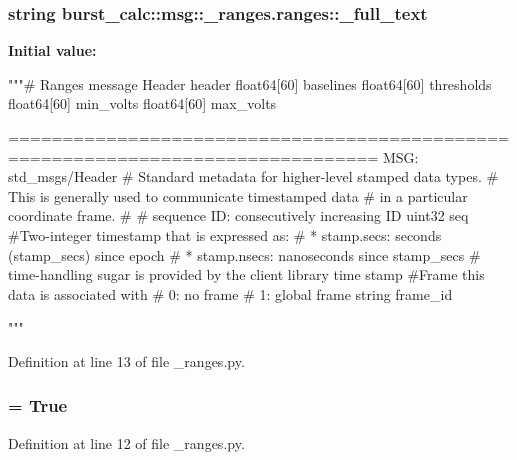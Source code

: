 \subsubsection[{\-\_\-full\-\_\-text}]{\setlength{\rightskip}{0pt plus 5cm}string {\bf burst\-\_\-calc\-::msg\-::\-\_\-ranges.\-ranges\-::\-\_\-full\-\_\-text}\hspace{0.3cm}{\ttfamily  [static, private]}}\label{classburst__calc_1_1msg_1_1__ranges_1_1ranges_aefd3611b9972291d06d7b72609d48af2}
{\bfseries \-Initial value\-:}
\begin{DoxyCode}
"""# Ranges message
Header header
float64[60] baselines
float64[60] thresholds
float64[60] min_volts
float64[60] max_volts

      ================================================================================
MSG: std_msgs/Header
# Standard metadata for higher-level stamped data types.
# This is generally used to communicate timestamped data 
# in a particular coordinate frame.
# 
# sequence ID: consecutively increasing ID 
uint32 seq
#Two-integer timestamp that is expressed as:
# * stamp.secs: seconds (stamp_secs) since epoch
# * stamp.nsecs: nanoseconds since stamp_secs
# time-handling sugar is provided by the client library
time stamp
#Frame this data is associated with
# 0: no frame
# 1: global frame
string frame_id

"""
\end{DoxyCode}


\-Definition at line 13 of file \-\_\-ranges.\-py.

\subsubsection[{\-\_\-has\-\_\-header}]{ = \-True\hspace{0.3cm}{\ttfamily  [static, private]}}\label{classburst__calc_1_1msg_1_1__ranges_1_1ranges_a7f2dacb1009dac528ddeaf0ac7c41c4a}


\-Definition at line 12 of file \-\_\-ranges.\-py.

